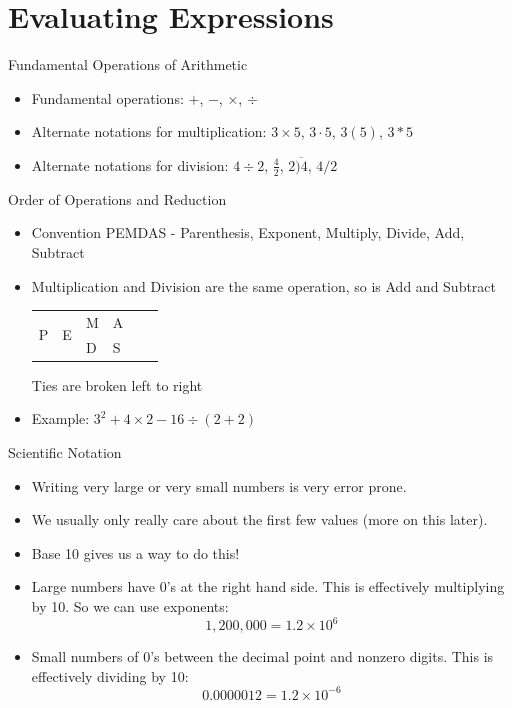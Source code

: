 \documentclass{beamer}
\begin{document}
\section{Evaluating Expressions}

\begin{frame}{Fundamental Operations of Arithmetic}
\begin{itemize}[<+(1)->]
    \item Fundamental operations: $+$, $-$, $\times$, $\div$
    \item Alternate notations for multiplication: $3\times 5$, $3\cdot 5$, $3(5)$, $3*5$
    \item Alternate notations for division: $4\div 2$, $\frac{4}{2}$, $2\overline{)4}$, $4/2$
\end{itemize}
\end{frame}

\begin{frame}{Order of Operations and Reduction}
\begin{itemize}[<+(1)->]
    \item Convention PEMDAS - Parenthesis, Exponent, Multiply, Divide, Add, Subtract
    \item Multiplication and Division are the same operation, so is Add and Subtract \newline
    \begin{tabular}{llllll}
        \multirow{2}{*}{P} & \multirow{2}{*}{E} & M & A\\
        & & D & S\\
    \end{tabular}\newline
    Ties are broken left to right
    \item Example: $3^2+4\times2-16\div(2+2)$
\end{itemize}
\end{frame}

\begin{frame}{Scientific Notation}
\begin{itemize}[<+(1)->]
    \item Writing very large or very small numbers is very error prone.
    \item We usually only really care about the first few values (more on this later).
    \item Base 10 gives us a way to do this!
    \item Large numbers have 0's at the right hand side.  This is effectively multiplying
    by 10.  So we can use exponents:
    \[
    1,200,000 = 1.2 \times 10^6
    \] 
   \item Small numbers of 0's between the decimal point and nonzero digits.  This is effectively dividing by 10:
   \[
   0.0000012 = 1.2 \times 10^{-6}
   \]
\end{itemize}
\end{frame}
\end{document}
